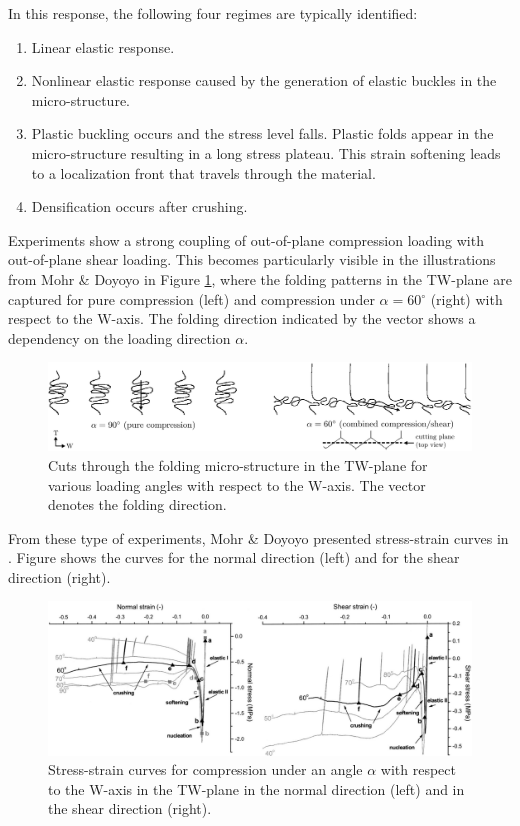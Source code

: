 \noindent In this response, the following four regimes are typically identified:
\begin{enumerate}[I]
    \item Linear elastic response.
    \item Nonlinear elastic response caused by the generation of elastic buckles in the micro-structure.
    \item Plastic buckling occurs and the stress level falls. Plastic folds appear in the micro-structure resulting in a long stress plateau. This strain softening leads to a localization front that travels through the material. 
    \item Densification occurs after crushing.
\end{enumerate}
Experiments show a strong coupling of out-of-plane compression loading with out-of-plane shear loading. This becomes particularly visible in the illustrations from Mohr \& Doyoyo \cite{mohrdoyoyo2004c} in Figure \ref{Ch2_shearbands}, where the folding patterns in the TW-plane are captured for pure compression (left) and compression under $\alpha = $60$^{\circ}$ (right) with respect to the W-axis. The folding direction indicated by the vector shows a dependency on the loading direction $\alpha$.
\begin{figure}[H]
    \centering
    \includegraphics[width=\linewidth]{./Images/Ch2/Ch2_shearbands_cut2.PNG}
    \caption{Cuts through the folding micro-structure in the TW-plane for various loading angles with respect to the W-axis. The vector denotes the folding direction. \cite{mohrdoyoyo2004c}}
    \label{Ch2_shearbands}
\end{figure}
From these type of experiments, Mohr \& Doyoyo presented stress-strain curves in \cite{mohrdoyoyo2004b}. Figure \label{Ch2_MDexperiments} shows the curves for the normal direction (left) and for the shear direction (right). 
\begin{figure}[H]
    \centering
    \includegraphics[width=\linewidth]{./Images/Ch2/Ch2_MDexperiments.png}
    \caption{Stress-strain curves for compression under an angle $\alpha$ with respect to the W-axis in the TW-plane in the normal direction (left) and in the shear direction (right). \cite{mohrdoyoyo2004b}}
    \label{Ch2_MDexperiments}
\end{figure}
